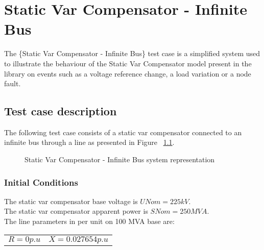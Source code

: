 \documentclass[a4paper, 12pt]{report}
\begin{document}
\chapter{Static Var Compensator - Infinite Bus}

The \{Static Var Compensator - Infinite Bus\} test case is a simplified system used to illustrate the behaviour of the Static Var Compensator model present in the \Dynawo library on events such as a voltage reference change, a load variation or a node fault.

\section{Test case description}

The following test case consists of a static var compensator connected to an infinite bus through a line as presented in Figure ~\ref{TestCase}.

\begin{figure}[H]
\centering
\def\factor{0.4}
\caption{Static Var Compensator - Infinite Bus system representation}
\label{TestCase}
\end{figure}

\subsection{Initial Conditions}

The static var compensator base voltage is $UNom = 225 kV$. \\

The static var compensator apparent power is $SNom = 250 MVA$.\\

The line parameters in per unit on 100 MVA base are:
\begin{center}
\begin{tabular}{l|l}
   $R = 0 p.u$ & $X = 0.027654 p.u$  \\
\end{tabular}
\end{center}
\end{document}
